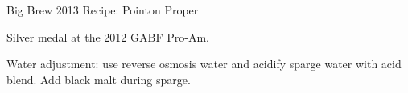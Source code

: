 \begin{recipe}{Big Brew 2013 Recipe: Pointon Proper}

\begin{aboutblock}
Silver medal at the 2012 GABF Pro-Am. \sourceaha
\end{aboutblock}


\begin{methodandtiming}

\begin{mashsteps}
\end{mashsteps}

\begin{fermentationsteps}
\end{fermentationsteps}

\begin{directions}
Water adjustment: use reverse osmosis water and acidify sparge water with 
acid blend. Add black malt during sparge.
\end{directions}

\end{methodandtiming}

\recipebreak

\begin{ingredientsblock}

\begin{malts}
\end{malts}

\begin{hops}
\end{hops}


\end{ingredientsblock}

\end{recipe}

